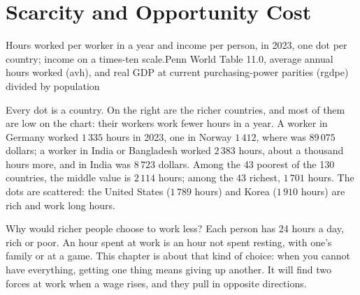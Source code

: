\chapter{Scarcity and Opportunity Cost}\label{ch:g7:scarcity-and-opportunity-cost}

\begin{openingchart}{Hours worked per worker in a year and income per person, in
2023, one dot per country; income on a times-ten scale.}{Penn World Table 11.0,
average annual hours worked (avh), and real GDP at current purchasing-power
parities (rgdpe) divided by population}
\end{openingchart}

Every dot is a country. On the right are the richer countries, and most of them
are low on the chart: their workers work fewer hours in a year. A worker in
Germany worked $1\,335$ hours in 2023, one in Norway $1\,412$, where 
was $89\,075$ dollars; a worker in India or Bangladesh worked $2\,383$ hours, about a
thousand hours more, and  in India was $8\,723$ dollars. Among the 43 poorest
of the 130 countries, the middle value is $2\,114$ hours; among the 43 richest,
$1\,701$ hours. The dots are scattered: the United States ($1\,789$ hours) and Korea
($1\,910$ hours) are rich and work long hours.

Why would richer people choose to work less? Each person has 24 hours a day, rich
or poor. An hour spent at work is an hour not spent resting, with one's family or
at a game. This chapter is about that kind of choice: when you cannot have
everything, getting one thing means giving up another. It will find two forces at
work when a wage rises, and they pull in opposite directions.

